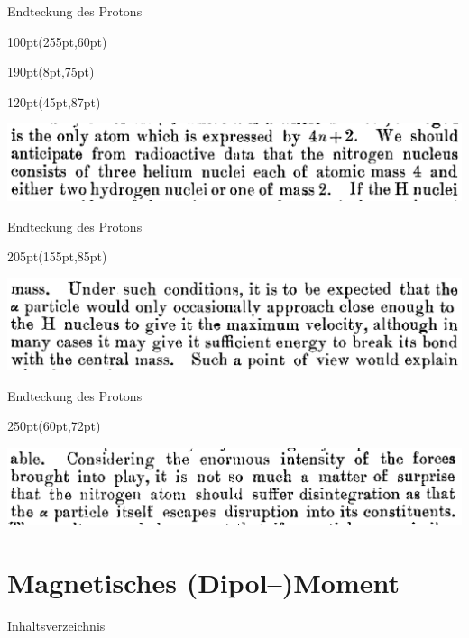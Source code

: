 \documentclass[t,9pt]{beamer}
\newcommand{\highlight}[3]{ \begin{textblock*}{#1}(#2,#3) \begin{tcolorbox} [enhanced,opacityfill=.1,colback=blue] \end{tcolorbox} \end{textblock*} } %
\begin{document}
        \begin{frame}{Endteckung des Protons}
                \highlight{100pt}{255pt}{60pt}
                \highlight{190pt}{8pt}{75pt}
                \highlight{120pt}{45pt}{87pt}
                \includegraphics[width=\textwidth]{prosi_nitrogen_made_of_H.png}
                \hfill\cite{Rutherford1919}
        \end{frame}

        \begin{frame}{Endteckung des Protons}
                \highlight{205pt}{155pt}{85pt}
                \includegraphics[width=\textwidth]{prosi_alpha_breaks_H_from_nitrogen.png}
                \cite{Rutherford1919}
        \end{frame}

        \begin{frame}{Endteckung des Protons}
                \highlight{250pt}{60pt}{72pt}
                \includegraphics[width=\textwidth]{prosi_nitrogen_disintegrates.png}
                \cite{Rutherford1919}
        \end{frame}

        \section{Magnetisches (Dipol--)Moment}

        \begin{frame}{Inhaltsverzeichnis}
                \tableofcontents[currentsection]
        \end{frame}
\end{document}

